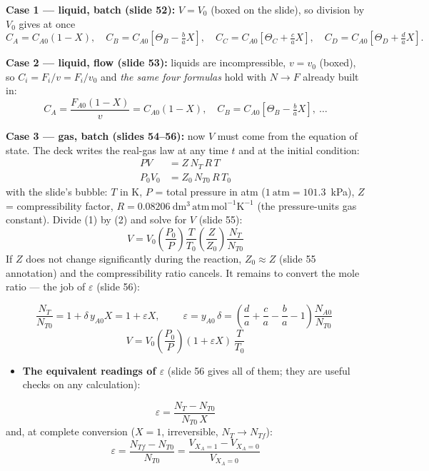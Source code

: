 \documentclass[10pt,a4paper]{article}
\newenvironment{formulabox}{%
  \par\addvspace{4pt}\noindent\begin{lrbox}{\spboxa}%
  \begin{minipage}{\dimexpr\linewidth-12pt\relax}\small\color{inbox}%
}{\end{minipage}\end{lrbox}%
  \fcolorbox{boxframe}{boxbg}{\usebox{\spboxa}}\par\addvspace{6pt}}
\begin{document}
\textbf{\color{accent}Case 1 --- liquid, batch (slide 52):} $V = V_0$ (boxed on the slide), so division by $V_0$ gives at once
\[
C_A = C_{A0}(1-X),\quad
C_B = C_{A0}\!\left[\Theta_B-\tfrac{b}{a}X\right],\quad
C_C = C_{A0}\!\left[\Theta_C+\tfrac{c}{a}X\right],\quad
C_D = C_{A0}\!\left[\Theta_D+\tfrac{d}{a}X\right].
\]

\textbf{\color{accent}Case 2 --- liquid, flow (slide 53):} liquids are incompressible, $v = v_0$ (boxed), so $C_i = F_i/v = F_i/v_0$ and \emph{the same four formulas} hold with $N\to F$ already built in:
\[
C_A = \frac{F_{A0}(1-X)}{v} = C_{A0}(1-X),\quad
C_B = C_{A0}\!\left[\Theta_B-\tfrac{b}{a}X\right],\ \dots
\]

\textbf{\color{accent}Case 3 --- gas, batch (slides 54--56):} now $V$ must come from the equation of state. The deck writes the real-gas law at any time $t$ and at the initial condition:
\begin{align*}
P V &= Z\,N_T\,R\,T \tag*{(1)}\\
P_0 V_0 &= Z_0\,N_{T0}\,R\,T_0 \tag*{(2)}
\end{align*}
with the slide's bubble: $T$ in K, $P$ = total pressure in atm ($1\ \mathrm{atm} = 101.3$~kPa), $Z$ = compressibility factor, $R = 0.08206\ \mathrm{dm^3\,atm\,mol^{-1}K^{-1}}$ (the pressure-units gas constant). Divide (1) by (2) and solve for $V$ (slide 55):
\[
V = V_0\left(\frac{P_0}{P}\right)\frac{T}{T_0}\left(\frac{Z}{Z_0}\right)\frac{N_T}{N_{T0}} \tag*{(3)}
\]
If $Z$ does not change significantly during the reaction, $Z_0\approx Z$ (slide 55 annotation) and the compressibility ratio cancels. It remains to convert the mole ratio --- the job of $\varepsilon$ (slide 56):
\begin{formulabox}
\[
\frac{N_T}{N_{T0}} = 1 + \delta\,y_{A0}X = 1 + \varepsilon X,
\qquad
\boxed{\;\varepsilon = y_{A0}\,\delta = \left(\frac{d}{a}+\frac{c}{a}-\frac{b}{a}-1\right)\frac{N_{A0}}{N_{T0}}\;}
\]
\[
V = V_0\left(\frac{P_0}{P}\right)(1+\varepsilon X)\,\frac{T}{T_0} \tag*{(5, constant $Z$)}
\]
\end{formulabox}
\begin{itemize}
\item \textbf{The equivalent readings of $\varepsilon$} (slide 56 gives all of them; they are useful checks on any calculation):
\end{itemize}
\begin{formulabox}
\[
\varepsilon = \frac{N_T - N_{T0}}{N_{T0}\,X}
\]
and, at complete conversion ($X=1$, irreversible, $N_T \to N_{Tf}$):
\[
\varepsilon = \frac{N_{Tf}-N_{T0}}{N_{T0}} = \frac{V_{X_A=1}-V_{X_A=0}}{V_{X_A=0}}
\]
\end{formulabox}
\end{document}
